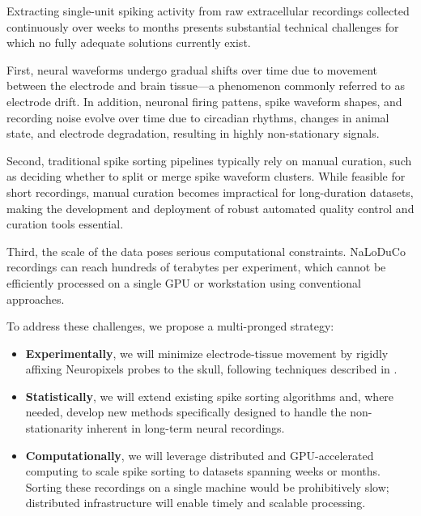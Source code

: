 
Extracting single-unit spiking activity from raw extracellular recordings
collected continuously over weeks to months presents substantial technical
challenges for which no fully adequate solutions currently exist.

First, neural waveforms undergo gradual shifts over time due to movement
between the electrode and brain tissue—a phenomenon commonly referred to as
electrode drift. In addition, neuronal firing pattens, spike waveform
shapes, and recording noise evolve over time due to circadian rhythms,
changes in animal state, and electrode degradation, resulting in
highly non-stationary signals.

Second, traditional spike sorting pipelines typically rely on manual
curation, such as deciding whether to split or merge spike waveform clusters.
While feasible for short recordings, manual curation becomes impractical for
long-duration datasets, making the development and deployment of robust
automated quality control and curation tools essential.

Third, the scale of the data poses serious computational constraints. NaLoDuCo recordings can reach hundreds of terabytes per experiment, which cannot be efficiently processed on a single GPU or workstation using conventional approaches.

To address these challenges, we propose a multi-pronged strategy:

\begin{itemize}

	\item \textbf{Experimentally}, we will minimize electrode-tissue movement
by rigidly affixing Neuropixels probes to the skull, following techniques
described in \citet[][Supplementary Discussion]{schoonoverEtAl21}.

	\item \textbf{Statistically}, we will extend existing spike sorting
algorithms and, where needed, develop new methods specifically designed to
handle the non-stationarity inherent in long-term neural recordings.

	\item \textbf{Computationally}, we will leverage distributed and
GPU-accelerated computing to scale spike sorting to datasets spanning weeks or
months. Sorting these recordings on a single machine would be prohibitively
slow; distributed infrastructure will enable timely and scalable processing.

\end{itemize}

